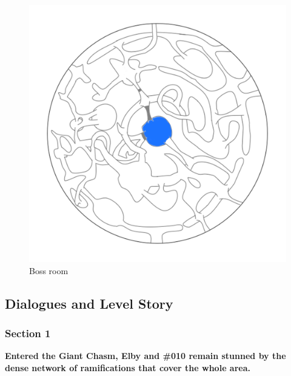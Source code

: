 \begin{figure}[H]
	\centering
	\includegraphics[width=0.7\linewidth]{images/map/2D_map_section_04.png}
	\caption*{Boss room}
\end{figure}
\newpage


\subsection{Dialogues and Level Story}

\subsubsection{Section 1}
\vspace*{0.3cm}

	\textbf{Entered the Giant Chasm, Elby and \#010 remain stunned by the dense network of ramifications that cover the whole area.}

